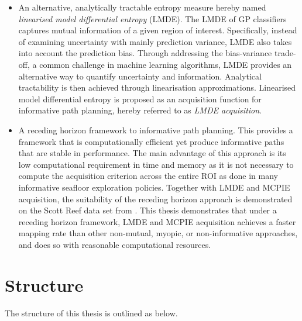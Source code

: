 \begin{itemize}
			\item An alternative, analytically tractable entropy measure hereby named \textit{linearised model differential entropy} (LMDE). The LMDE of GP classifiers captures mutual information of a given region of interest. Specifically, instead of examining uncertainty with mainly prediction variance, LMDE also takes into account the prediction bias. Through addressing the bias-variance trade-off, a common challenge in machine learning algorithms, LMDE provides an alternative way to quantify uncertainty and information. Analytical tractability is then achieved through linearisation approximations. Linearised model differential entropy is proposed as an acquisition function for informative path planning, hereby referred to as \textit{LMDE acquisition}.
			
			\item A receding horizon framework to informative path planning. This provides a framework that is computationally efficient yet produce informative paths that are stable in performance. The main advantage of this approach is its low computational requirement in time and memory as it is not necessary to compute the acquisition criterion across the entire ROI as done in many informative seafloor exploration policies. Together with LMDE and MCPIE acquisition, the suitability of the receding horizon approach is demonstrated on the Scott Reef data set from \cite{IMOS}. This thesis demonstrates that under a receding horizon framework, LMDE and MCPIE acquisition achieves a faster mapping rate than other non-mutual, myopic, or non-informative approaches, and does so with reasonable computational resources. 
			
		\end{itemize}
			
	\section{Structure}
	\label{Introduction:Structure}
	
		The structure of this thesis is outlined as below.
		
